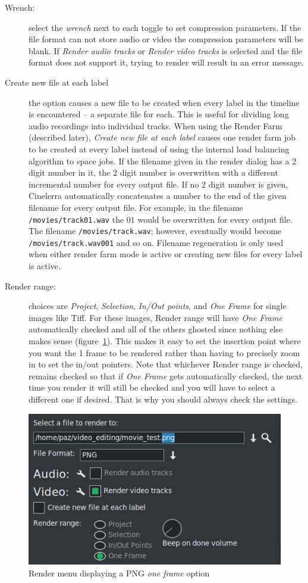 \begin{description}
    \item[Wrench:] select the \textit{wrench} next to each toggle to set compression parameters.  If the file format can not store audio or video the compression parameters will be blank.  If \textit{Render audio tracks} or \textit{Render video tracks} is selected and the file format does not support it, trying to render will result in an error message.
    \item[Create new file at each label] the option causes a new file to be created when every label in the timeline is encountered – a separate file for each.  This is useful for dividing long audio recordings into individual tracks.  When using the Render Farm (described later), \textit{Create new file at each label} causes one render farm job to be created at every label instead of using the internal load balancing algorithm to space jobs.   If the filename given in the render dialog has a 2 digit number in it, the 2 digit number is overwritten with a different incremental number for every output file. If no 2 digit number is given, Cinelerra automatically concatenates a number to the end of the given filename for every output file.
    For example, in the filename \texttt{/movies/track01.wav} the $01$ would be overwritten for every output file. 
    The filename \texttt{/movies/track.wav}; however, eventually would become \texttt{/movies/track.wav001} and so on.  
    Filename regeneration is only used when either render farm mode is active or creating new files for every label is active.
    \item[Render range:] choices are \textit{Project}, \textit{Selection}, \textit{In/Out points}, and \textit{One Frame} for single images like Tiff.  For these images, Render range will have \textit{One Frame} automatically checked and all of the others ghosted since nothing else makes sense (figure~\ref{fig:render02}).  This makes it easy to set the insertion point where you want the 1 frame to be rendered rather than having to precisely zoom in to set the in/out pointers.  Note that whichever Render range is checked, remains checked so that if \textit{One Frame} gets automatically checked, the next time you render it will still be checked and you will have to select a different one if desired.  That is why you should always check the settings.
\end{description}

\begin{figure}[htpb]
    \centering
    \includegraphics[width=0.7\linewidth]{images/render02.png}
    \caption{Render menu displaying a PNG \textit{one frame} option}
    \label{fig:render02}
\end{figure}


